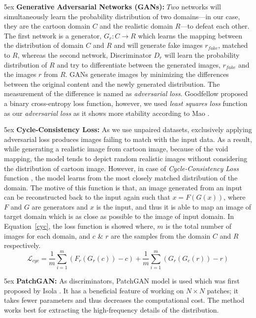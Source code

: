 \documentclass[10pt,twocolumn,letterpaper]{article}
\begin{document}
\parindent 5ex \textbf{Generative Adversarial Networks (GANs):} $Two$ networks will simultaneously learn the probability distribution of two domains---in our case, they are the cartoon domain $C$ and the realistic domain $R$---to defeat each other. The first network is a generator, $G_r: C\rightarrow R$ which learns the mapping between the distribution of domain $C$ and $R$ and will generate fake images $r_{fake}$, matched to $R$, whereas the second network,  Discriminator $D_r$ will learn the probability distribution of $R$ and try to differentiate between the generated images, $r_{fake}$ and the images $r$ from $R$. GANs generate images by minimizing the differences between the original content and the newly generated distribution. The measurement of the difference is named as \textit{adversarial loss}. Goodfellow \etal \cite{goodfellow2014generative} proposed a binary cross-entropy loss function, however, we used \textit{least squares loss} function as our \textit{adversarial loss} as it shows more stability according to Mao \etal \cite{DBLP:conf/iccv/MaoLXLWS17}.

\parindent 5ex \textbf{Cycle-Consistency Loss:}
As
we
use
unpaired datasets, exclusively applying adversarial loss produces images
failing to match with the input data. As a result, while generating a realistic image from cartoon image, because of the void mapping, the model tends to depict random realistic images without considering the distribution of cartoon image. However, in case of \textit{Cycle-Consistency Loss} function \cite{CycleGAN2017}, the model learns from the most closely matched distribution of the domain. The motive of this function is that, an image generated from an input can be reconstructed back to the input again such that $x = F(G(x))$, where $F$ and $G$ are generators and $x$ is the input, and thus it is able to map an image of target domain which is as close as possible to the image of input domain.
In Equation~\ref{cyc}, the loss function is showed where, $m$ is the total number of images for each domain, and $c$ \& $r$ are the samples from the domain $C$ and $R$ respectively.
\begin{equation}
\label{cyc}
\mathcal{L}_{cyc} = \frac{1}{m} \sum^m_{i=1}(F_r(G_r(c)) - c) + \frac{1}{m} \sum^m_{i=1}(G_r(G_c(r)) - r)
\end{equation} 


\parindent 5ex \textbf{PatchGAN:}
As discriminators, PatchGAN model is used which was first proposed by Isola \etal
\cite{isola2017image}.
It has a 
beneficial feature 
of
working on $N\times N$ patches; it takes fewer parameters and thus decreases the computational cost. The method works best for extracting the high-frequency details of the distribution.
\end{document}
